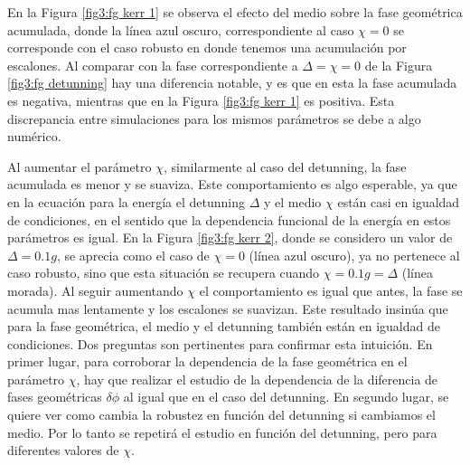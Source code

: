 En la Figura \ref{fig3:fg kerr 1} se observa el efecto del medio sobre la fase geométrica acumulada, donde la línea azul oscuro, correspondiente al caso $\chi=0$ se corresponde con el caso robusto en donde tenemos una acumulación por escalones. Al comparar con la fase correspondiente a $\Delta=\chi=0$ de la Figura \ref{fig3:fg detunning} hay una diferencia notable, y es que en esta la fase acumulada es negativa, mientras que en la Figura \ref{fig3:fg kerr 1} es positiva. Esta discrepancia entre simulaciones para los mismos parámetros se debe a algo numérico. 

Al aumentar el parámetro $\chi$, similarmente al caso del detunning, la fase acumulada es menor y se suaviza. Este comportamiento es algo esperable, ya que en la ecuación para la energía el detunning $\Delta$ y el medio $\chi$ están casi en igualdad de condiciones, en el sentido que la dependencia funcional de la energía en estos parámetros es igual.
En la Figura \ref{fig3:fg kerr 2}, donde se considero un valor de $\Delta=0.1g$, se aprecia como el caso de $\chi=0$ (línea azul oscuro), ya no pertenece al caso robusto, sino que esta situación se recupera cuando $\chi=0.1g=\Delta$ (línea morada). Al seguir aumentando $\chi$ el comportamiento es igual que antes, la fase se acumula mas lentamente y los escalones se suavizan. 
Este resultado insinúa que para la fase geométrica, el medio y el detunning también están en igualdad de condiciones. Dos preguntas son pertinentes para confirmar esta intuición. En primer lugar, para corroborar la dependencia de la fase geométrica en el parámetro $\chi$, hay que realizar el estudio de la dependencia de la diferencia de fases geométricas $\delta\phi$ al igual que en el caso del detunning. En segundo lugar, se quiere ver como cambia la robustez en función del detunning si cambiamos el medio. Por lo tanto se repetirá el estudio en función del detunning, pero para diferentes valores de $\chi$.
